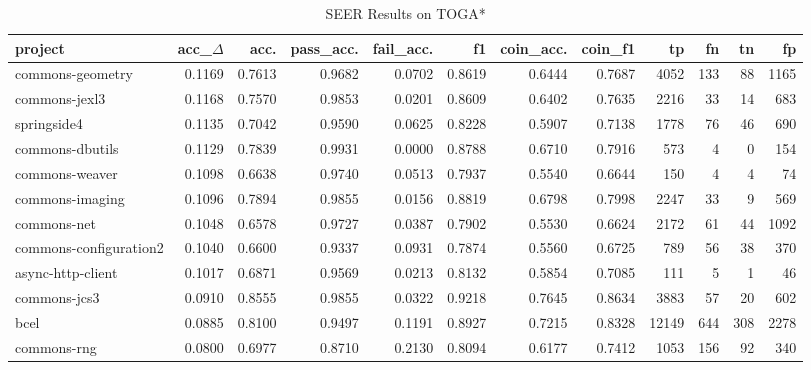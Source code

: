\begin{table*}
\centering
\caption{SEER Results on TOGA*}
\label{tab:toga_results_all}
\begin{tabular}{lrrrrrrrrrrr}
\toprule
                project &  acc\_$\Delta$ &    acc. &  pass\_acc. &  fail\_acc. &      f1 &  coin\_acc. &  coin\_f1 &      tp &    fn &    tn &     fp \\
\midrule
       commons-geometry &      0.1169 &  0.7613 &     0.9682 &     0.0702 &  0.8619 &     0.6444 &   0.7687 &    4052 &   133 &    88 &   1165 \\
          commons-jexl3 &      0.1168 &  0.7570 &     0.9853 &     0.0201 &  0.8609 &     0.6402 &   0.7635 &    2216 &    33 &    14 &    683 \\
            springside4 &      0.1135 &  0.7042 &     0.9590 &     0.0625 &  0.8228 &     0.5907 &   0.7138 &    1778 &    76 &    46 &    690 \\
        commons-dbutils &      0.1129 &  0.7839 &     0.9931 &     0.0000 &  0.8788 &     0.6710 &   0.7916 &     573 &     4 &     0 &    154 \\
         commons-weaver &      0.1098 &  0.6638 &     0.9740 &     0.0513 &  0.7937 &     0.5540 &   0.6644 &     150 &     4 &     4 &     74 \\
        commons-imaging &      0.1096 &  0.7894 &     0.9855 &     0.0156 &  0.8819 &     0.6798 &   0.7998 &    2247 &    33 &     9 &    569 \\
            commons-net &      0.1048 &  0.6578 &     0.9727 &     0.0387 &  0.7902 &     0.5530 &   0.6624 &    2172 &    61 &    44 &   1092 \\
 commons-configuration2 &      0.1040 &  0.6600 &     0.9337 &     0.0931 &  0.7874 &     0.5560 &   0.6725 &     789 &    56 &    38 &    370 \\
      async-http-client &      0.1017 &  0.6871 &     0.9569 &     0.0213 &  0.8132 &     0.5854 &   0.7085 &     111 &     5 &     1 &     46 \\
           commons-jcs3 &      0.0910 &  0.8555 &     0.9855 &     0.0322 &  0.9218 &     0.7645 &   0.8634 &    3883 &    57 &    20 &    602 \\
                   bcel &      0.0885 &  0.8100 &     0.9497 &     0.1191 &  0.8927 &     0.7215 &   0.8328 &   12149 &   644 &   308 &   2278 \\
            commons-rng &      0.0800 &  0.6977 &     0.8710 &     0.2130 &  0.8094 &     0.6177 &   0.7412 &    1053 &   156 &    92 &    340 \\

\end{tabular}
\end{table*}
